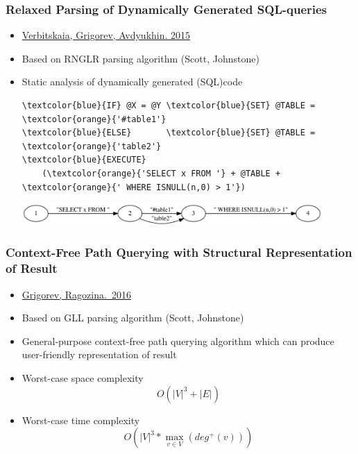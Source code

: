 \documentclass[xcolor=table]{beamer}
\begin{document}
\begin{frame}[fragile]
  \transwipe[direction=90]
  \frametitle{Relaxed Parsing of Dynamically Generated SQL-queries}
  \begin{itemize}
    \item \href{https://link.springer.com/chapter/10.1007/978-3-319-41579-6\_22}{Verbitskaia, Grigorev, Avdyukhin. 2015}
    \item Based on RNGLR parsing algorithm (Scott, Johnstone)
    \item Static analysis of dynamically generated (SQL)code

        \begin{Verbatim}[commandchars=\\\{\}]
\textcolor{blue}{IF} @X = @Y \textcolor{blue}{SET} @TABLE = \textcolor{orange}{'#table1'}
\textcolor{blue}{ELSE}       \textcolor{blue}{SET} @TABLE = \textcolor{orange}{'table2'}
\textcolor{blue}{EXECUTE} 
    (\textcolor{orange}{'SELECT x FROM '} + @TABLE + \textcolor{orange}{' WHERE ISNULL(n,0) > 1'})
        \end{Verbatim}
     \centering{\huge{$ \Downarrow $}}
                \includegraphics[width = 0.9\textwidth]{pictures/approximation1.pdf} \\
      
  \end{itemize}
\end{frame}

\begin{frame}
  \transwipe[direction=90]
  \frametitle{Context-Free Path Querying with Structural Representation of Result}
  \begin{itemize}
    \item \href{https://arxiv.org/abs/1612.08872}{Grigorev, Ragozina.~2016}
    \item Based on GLL parsing algorithm (Scott, Johnstone)
    \item General-purpose context-free path querying algorithm which can produce user-friendly representation of result
    \item Worst-case space complexity $$O(|V|^3 + |E|)$$
    \item Worst-case time complexity $$O\left(|V|^3*\max\limits_{v \in V}\left(deg^+\left(v\right)\right)\right)$$
  \end{itemize}
\end{frame}
\end{document}
